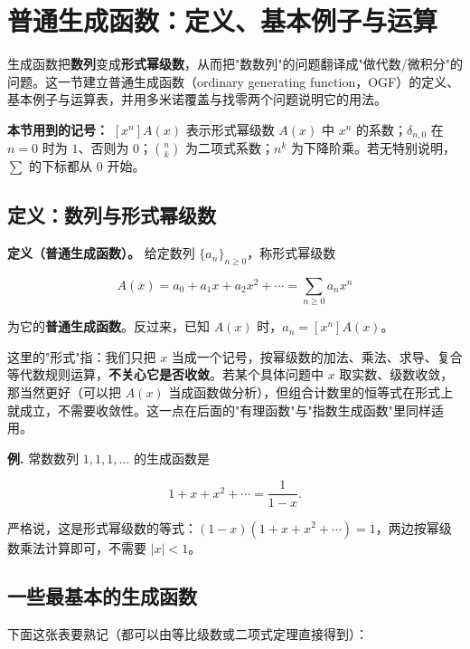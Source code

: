\section{普通生成函数：定义、基本例子与运算}


生成函数把\textbf{数列}变成\textbf{形式幂级数}，从而把"数数列"的问题翻译成"做代数/微积分"的问题。这一节建立普通生成函数（ordinary generating function，OGF）的定义、基本例子与运算表，并用多米诺覆盖与找零两个问题说明它的用法。

\textbf{本节用到的记号：} $[x^n]A(x)$ 表示形式幂级数 $A(x)$ 中 $x^n$ 的系数；$\delta_{n,0}$ 在 $n=0$ 时为 $1$、否则为 $0$；$\binom nk$ 为二项式系数；$n^{\underline{k}}$ 为下降阶乘。若无特别说明，$\sum$ 的下标都从 $0$ 开始。

\subsection{定义：数列与形式幂级数}


\textbf{定义（普通生成函数）。} 给定数列 $\{a_n\}_{n\ge0}$，称形式幂级数

\[
A(x)=a_0+a_1x+a_2x^2+\cdots=\sum_{n\ge0}a_nx^n
\]

为它的\textbf{普通生成函数}。反过来，已知 $A(x)$ 时，$a_n=[x^n]A(x)$。

这里的"形式"指：我们只把 $x$ 当成一个记号，按幂级数的加法、乘法、求导、复合等代数规则运算，\textbf{不关心它是否收敛}。若某个具体问题中 $x$ 取实数、级数收敛，那当然更好（可以把 $A(x)$ 当成函数做分析），但组合计数里的恒等式在形式上就成立，不需要收敛性。这一点在后面的"有理函数"与"指数生成函数"里同样适用。

\textbf{例.} 常数数列 $1,1,1,\dots$ 的生成函数是

\[
1+x+x^2+\cdots=\frac{1}{1-x}.
\]

严格说，这是形式幂级数的等式：$(1-x)(1+x+x^2+\cdots)=1$，两边按幂级数乘法计算即可，不需要 $|x|<1$。

\subsection{一些最基本的生成函数}


下面这张表要熟记（都可以由等比级数或二项式定理直接得到）：

